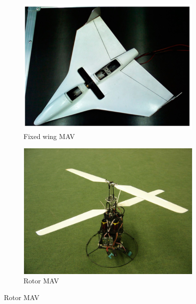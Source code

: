 \begin{figure}[H]
     \centering
     \begin{subfigure}[b]{0.3\textwidth}
         \centering
         \includegraphics[width=\textwidth]{01_Introduction/Figs/fixed.jpg}
         \caption{Fixed wing \acrshort{MAV} \cite{Sibilski2020}}
     \end{subfigure}
     \hfill
     \begin{subfigure}[b]{0.3\textwidth}
         \centering
         \includegraphics[width=\textwidth]{01_Introduction/Figs/rotar.png}
         \caption{Rotor \acrshort{MAV} \cite{rotar2022}}
     \end{subfigure}
     \hfill

\end{figure}
